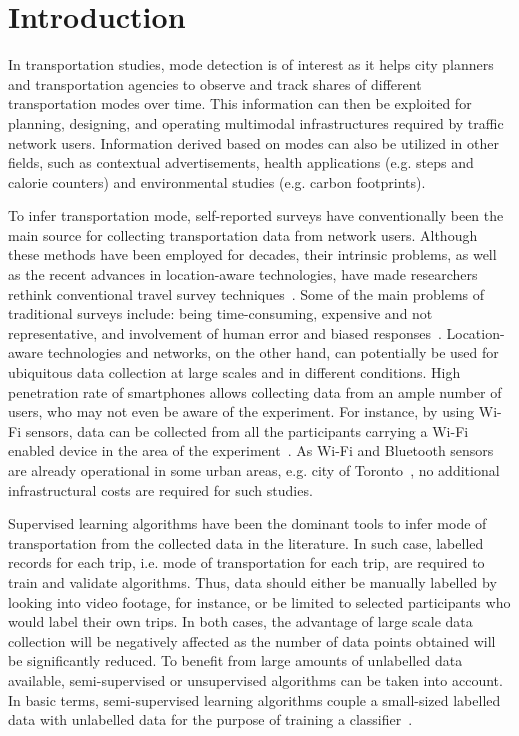 \section{Introduction}
\label{S:w1}
In transportation studies, mode detection is of interest as it helps city planners and transportation agencies to observe and track shares of different transportation modes over time. This information can then be exploited for planning, designing, and operating multimodal infrastructures required by traffic network users. Information derived based on modes can also be utilized in other fields, such as contextual advertisements, health applications (e.g. steps and calorie counters) and environmental studies (e.g. carbon footprints).

To infer transportation mode, self-reported surveys have conventionally been the main source for collecting transportation data from network users. Although these methods have been employed for decades, their intrinsic problems, as well as the recent advances in location-aware technologies, have made researchers rethink conventional travel survey techniques~\cite{chen2010evaluating}. Some of the main problems of traditional surveys include: being time-consuming, expensive and not representative, and involvement of human error and biased responses~\cite{murakami2004using,gong2012gps,stopher2007household}. Location-aware technologies and networks, on the other hand, can potentially be used for ubiquitous data collection at large scales and in different conditions. High penetration rate of smartphones allows collecting data from an ample number of users, who may not even be aware of the experiment. For instance, by using Wi-Fi sensors, data can be collected from all the participants carrying a Wi-Fi enabled device in the area of the experiment~\cite{farooq2015ubiquitous}. As Wi-Fi and Bluetooth sensors are already operational in some urban areas, e.g. city of Toronto~\cite{opendata}, no additional infrastructural costs are required for such studies.


Supervised learning algorithms have been the dominant tools to infer mode of transportation from the collected data in the literature. In such case, labelled records for each trip, i.e. mode of transportation for each trip, are required to train and validate algorithms. Thus, data should either be manually labelled by looking into video footage, for instance, or be limited to selected participants who would label their own trips. In both cases, the advantage of large scale data collection will be negatively affected as the number of data points obtained will be significantly reduced. To benefit from large amounts of unlabelled data available, semi-supervised or unsupervised algorithms can be taken into account. In basic terms, semi-supervised learning algorithms couple a small-sized labelled data with unlabelled data for the purpose of training a classifier~\cite{blum1998combining}. 

